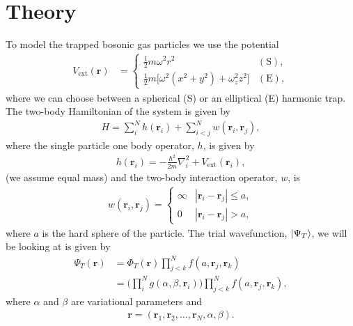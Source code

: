\documentclass[
    a4paper, aps, twocolumn, floatfix, superscriptaddress, nofootinbib]{revtex4-1}
\newcommand{\vf}{\mathbf}
\newcommand{\1}{\mathds{1}}
\newcommand{\half}{\frac{1}{2}}
\begin{document}
\section{Theory}
    To model the trapped bosonic gas particles we use the potential
    \begin{align}
        V_{\text{ext}}(\vf{r})
        &=
        \begin{cases}
            \half m\omega^2r^2 & (\text{S}), \\
            \half m \bigl[
                \omega^2(x^2 + y^2) + \omega_z^2z^2
            \bigr] & (\text{E}),
        \end{cases}
    \end{align}
    where we can choose between a spherical (S) or an elliptical (E) harmonic
    trap. The two-body Hamiltonian of the system is given by
    \begin{align}
        H = \sum_{i}^{N}h(\vf{r}_i) + \sum_{i < j}^{N}w(\vf{r}_i, \vf{r}_j),
    \end{align}
    where the single particle one body operator, $h$, is given by
    \begin{align}
        h(\vf{r}_i) = -\frac{\hbar^2}{2m}\nabla_i^2
        + V_{\text{ext}}(\vf{r}_i),
    \end{align}
    (we assume equal mass)
    and the two-body interaction operator, $w$, is
    \begin{align}
        w(\vf{r}_i, \vf{r}_j)
        = \begin{cases}
            \infty & |\vf{r}_i - \vf{r}_j| \leq a, \\
            0 & |\vf{r}_i - \vf{r}_j| > a,
        \end{cases}
    \end{align}
    where $a$ is the hard sphere of the particle. The trial wavefunction,
    $\ket{\Psi_T}$, we will
    be looking at is given by
    \begin{align}
        \Psi_T(\vf{r})
        &= \Phi_T(\vf{r})
        \prod_{j < k}^N f(a, \vf{r}_j, \vf{r}_k) \\
        &= \Biggl(
            \prod_i^N g(\alpha, \beta, \vf{r}_i)
        \Biggr)
        \prod_{j < k}^N f(a, \vf{r}_j, \vf{r}_k),
        \label{eq:initial_trial_wavefunction}
    \end{align}
    where $\alpha$ and $\beta$ are variational parameters and
    \begin{align}
        \vf{r} = (\vf{r}_1, \vf{r}_2, \dots, \vf{r}_N, \alpha, \beta).
    \end{align}
\end{document}
